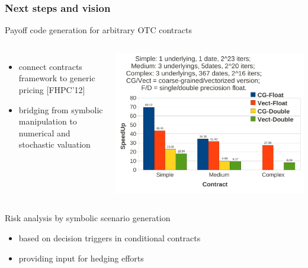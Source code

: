 \documentclass[xcolor=dvipsnames,11pt]{beamer}
\renewcommand{\emph}[1]{\textcolor{structure!90}{#1}}
\begin{document}

\begin{frame}
    \frametitle{Next steps and vision}

\emph{Payoff code generation} for arbitrary OTC contracts

\begin{columns}
\begin{itemize}
\item connect contracts framework to generic pricing [FHPC'12]

\item bridging from symbolic manipulation to numerical and stochastic valuation
\end{itemize}

\includegraphics[width=1.2\textwidth]{SpeedUpNewFig}
\end{columns}
\medskip
\hrulefill

\emph{Risk analysis} by symbolic scenario generation
\begin{itemize}
\item based on decision triggers in conditional contracts
\item providing input for hedging efforts
\end{itemize}

\end{frame}


\frame{\huge \centering \emph{\bf Appendix}\\}
\end{document}
